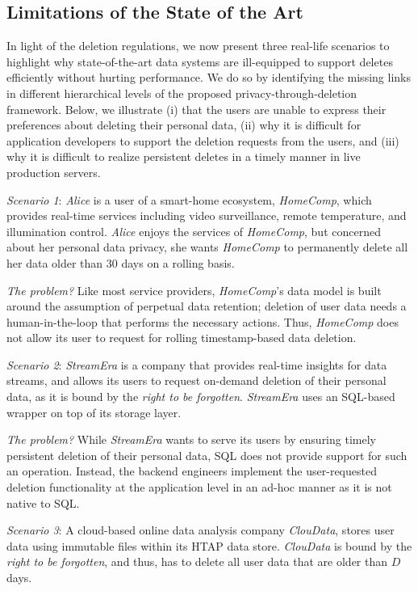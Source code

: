 \documentclass[11pt,dvipdfmx]{article}
\newcommand\Paragraphqit[1]{\vspace{0.02in}  \noindent \textit{#1?}}
\begin{document}
\subsection{Limitations of the State of the Art} 
In light of the deletion regulations, we now present three real-life scenarios to highlight why state-of-the-art data systems are ill-equipped to support deletes efficiently without hurting performance. 
We do so by identifying the missing links in different hierarchical levels of the proposed privacy-through-deletion framework.
Below, we illustrate (i) that the users are unable to express their preferences about deleting their personal data, (ii) why it is difficult for application developers to support the deletion requests from the users, and (iii) why it is difficult to realize persistent deletes in a timely manner in live production servers.


\textit{Scenario 1}: \textit{Alice} is a user of a smart-home ecosystem, \textit{HomeComp}, which provides real-time services including video surveillance, remote temperature, and illumination control. 
\textit{Alice} enjoys the services of \textit{HomeComp}, but concerned about her personal data privacy, she wants \textit{HomeComp} to permanently delete all her data older than $30$ days on a rolling basis.  

\Paragraphqit{The problem}
Like most service providers, \textit{HomeComp}'s data model is built around the assumption of perpetual data retention; deletion of user data needs a human-in-the-loop that performs the necessary actions.
Thus, \textit{HomeComp} does not allow its user to request for rolling timestamp-based data deletion. 

\textit{Scenario 2}: \textit{StreamEra} is a company that provides real-time insights for data streams, and allows its users to request on-demand deletion of their personal data, as it is bound by the \emph{right to be forgotten}.
\textit{StreamEra} uses an SQL-based wrapper on top of its storage layer.

\Paragraphqit{The problem} 
While \textit{StreamEra} wants to serve its users by ensuring timely persistent deletion of their personal data, SQL does not provide support for such an operation.
Instead, the backend engineers implement the user-requested deletion functionality at the application level in an ad-hoc manner as it is not native to SQL.

\textit{Scenario 3}: A cloud-based online data analysis company \textit{ClouData}, stores user data using immutable files within its HTAP data store. 
\textit{ClouData} is bound by the \emph{right to be forgotten}, and thus, has to delete all user data that are older than $D$ days.
\end{document}
